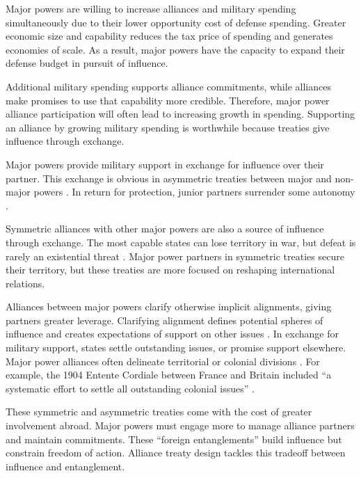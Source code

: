 \documentclass[12pt]{article}
\begin{document}
Major powers are willing to increase alliances and military spending simultaneously due to their lower opportunity cost of defense spending. 
Greater economic size and capability reduces the tax price of spending and generates economies of scale. 
As a result, major powers have the capacity to expand their defense budget in pursuit of influence.  


Additional military spending supports alliance commitments, while alliances make promises to use that capability more credible. 
Therefore, major power alliance participation will often lead to increasing growth in spending. 
Supporting an alliance by growing military spending is worthwhile because treaties give influence through exchange. 


Major powers provide military support in exchange for influence over their partner. 
This exchange is obvious in asymmetric treaties between major and non-major powers \citep{Morrow1991}. 
In return for protection, junior partners surrender some autonomy \citep{Lake2009}. 


Symmetric alliances with other major powers are also a source of influence through exchange.
The most capable states can lose territory in war, but defeat is rarely an existential threat \citep{Fazal2011}.  
Major power partners in symmetric treaties secure their territory, but these treaties are more focused on reshaping international relations. 


Alliances between major powers clarify otherwise implicit alignments, giving partners greater leverage. 
Clarifying alignment defines potential spheres of influence and creates expectations of support on other issues \citep{Snyder1997}. 
In exchange for military support, states settle outstanding issues, or promise support elsewhere. 
Major power alliances often delineate territorial or colonial divisions \cite{Langer1950, Kissinger1994}.
For example, the 1904 Entente Cordiale between France and Britain included ``a systematic effort to settle all outstanding colonial issues'' \citep[pg. 189]{Kissinger1994}.   


These symmetric and asymmetric treaties come with the cost of greater involvement abroad.
Major powers must engage more to manage alliance partners and maintain commitments.
These ``foreign entanglements'' build influence but constrain freedom of action.
Alliance treaty design tackles this tradeoff between influence and entanglement. 
\end{document}
